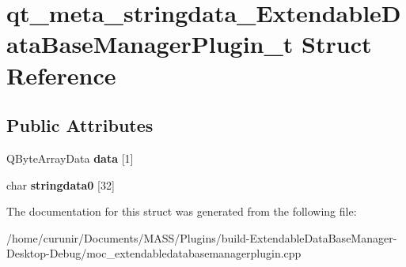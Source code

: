 \hypertarget{structqt__meta__stringdata___extendable_data_base_manager_plugin__t}{}\section{qt\+\_\+meta\+\_\+stringdata\+\_\+\+Extendable\+Data\+Base\+Manager\+Plugin\+\_\+t Struct Reference}
\label{structqt__meta__stringdata___extendable_data_base_manager_plugin__t}
\subsection*{Public Attributes}
\begin{DoxyCompactItemize}
\item 
Q\+Byte\+Array\+Data {\bfseries data} \mbox{[}1\mbox{]}\hypertarget{structqt__meta__stringdata___extendable_data_base_manager_plugin__t_aada95202d0c0a020265e9404cb2fa195}{}\label{structqt__meta__stringdata___extendable_data_base_manager_plugin__t_aada95202d0c0a020265e9404cb2fa195}

\item 
char {\bfseries stringdata0} \mbox{[}32\mbox{]}\hypertarget{structqt__meta__stringdata___extendable_data_base_manager_plugin__t_a9bebd76ef9aa0268625c5d456f8ab514}{}\label{structqt__meta__stringdata___extendable_data_base_manager_plugin__t_a9bebd76ef9aa0268625c5d456f8ab514}

\end{DoxyCompactItemize}


The documentation for this struct was generated from the following file\+:\begin{DoxyCompactItemize}
\item 
/home/curunir/\+Documents/\+M\+A\+S\+S/\+Plugins/build-\/\+Extendable\+Data\+Base\+Manager-\/\+Desktop-\/\+Debug/moc\+\_\+extendabledatabasemanagerplugin.\+cpp\end{DoxyCompactItemize}
